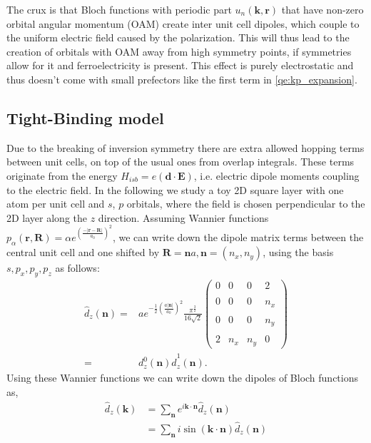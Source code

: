 The crux is that Bloch functions with periodic part $u_n(\bm{k},\bm{r})$ that have non-zero orbital angular momentum (OAM) create inter unit cell dipoles, which couple to the uniform electric field caused by the polarization. This will thus lead to the creation of orbitals with OAM away from high symmetry points, if symmetries allow for it and ferroelectricity is present. This effect is purely electrostatic and thus doesn't come with small prefectors like the first term in \ref{qe:kp_expansion}.

\subsection{Tight-Binding model}
Due to the breaking of inversion symmetry there are extra allowed hopping terms between unit cells, on top of the usual ones from overlap integrals. These terms originate from the energy $H_{isb} = e (\bm{d}\cdot \bm{E})$, i.e. electric dipole moments coupling to the electric field. In the following we study a toy 2D square layer with one atom per unit cell and $s$, $p$ orbitals, where the field is chosen perpendicular to the 2D layer along the $z$ direction. Assuming Wannier functions $p_\alpha(\bm{r},\bm{R}) = \alpha e^{\left(\frac{-|\bm{r}-\bm{R}|}{a_0}\right)^2}$, we can write down the dipole matrix terms between the central unit cell and one shifted by $\bm{R}=\bm{n}a, \bm{n}=(n_x,n_y)$, using the basis $s, p_x, p_y, p_z$ as follows:
\begin{align}
	\label{eq:dipole}
	\hat{d}_z(\bm{n}) =& ae^{-\frac{1}{2}\left(\frac{a|\bm{n}|}{a_0}\right)^2}\frac{\pi^{\frac{3}{2}}}{16\sqrt{2}}\left(\begin{matrix}0&0&0&2\\\\0&0&0&n_x\\\\0&0&0&n_y\\\\2&n_x&n_y&0\end{matrix}\right)\\
	=&d_z^0(\bm{n})\hat{d}^1_z(\bm{n}).
\end{align}
Using these Wannier functions we can write down the dipoles of Bloch functions as,
\begin{align}
	\hat{d}_z(\bm{k}) &= \sum_{\bm{n}} e^{i \bm{k}\cdot \bm{n}}\hat{d}_z(\bm{n})\\
	&=\sum_{\bm{n}}i \sin(\bm{k}\cdot\bm{n}) \hat{d}_z(\bm{n})
\end{align}
